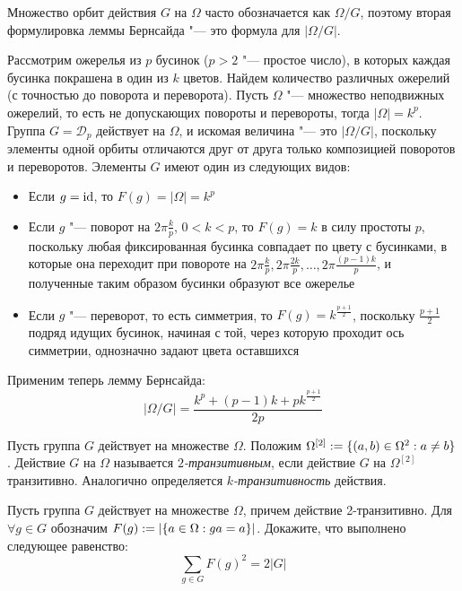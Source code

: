 \begin{note}
	Множество орбит действия $G$ на $\Omega$ часто обозначается как $\Omega / G$, поэтому вторая формулировка леммы Бернсайда "--- это формула для $|\Omega / G|$.
\end{note}

\begin{example}
	Рассмотрим ожерелья из $p$ бусинок ($p > 2$ "--- простое число), в которых каждая бусинка покрашена в один из $k$ цветов. Найдем количество различных ожерелий (с точностью до поворота и переворота). Пусть $\Omega$ "--- множество неподвижных ожерелий, то есть не допускающих повороты и перевороты, тогда $|\Omega| = k^p$. Группа $G = \mathcal{D}_p$ действует на $\Omega$, и искомая величина "--- это $|\Omega / G|$, поскольку элементы одной орбиты отличаются друг от друга только композицией поворотов и переворотов. Элементы $G$ имеют один из следующих видов:
	\begin{itemize}
		\item Если $g = \operatorname{id}$, то $F(g) = |\Omega| = k^p$
		\item Если $g$ "--- поворот на $2\pi\frac kp$, $0 < k < p$, то $F(g) = k$ в силу простоты $p$, поскольку любая фиксированная бусинка совпадает по цвету с бусинками, в которые она переходит при повороте на $2\pi\frac kp, 2\pi\frac {2k}p, \dotsc, 2\pi\frac {(p-1)k}p$, и полученные таким образом бусинки образуют все ожерелье
		\item Если $g$ "--- переворот, то есть симметрия, то $F(g) = k^{\frac{p+1}2}$, поскольку ${\frac{p+1}2}$ подряд идущих бусинок, начиная с той, через которую проходит ось симметрии, однозначно задают цвета оставшихся
	\end{itemize}
	
	Применим теперь лемму Бернсайда:
	\[|\Omega / G| = \frac{k^p + (p-1)k + pk^{\frac{p+1}2}}{2p}\]
\end{example}

\begin{definition}
	Пусть группа $G$ действует на множестве $\Omega$. Положим $\Omega^{[2]} := \{(a, b) \hm\in \Omega^2: a \ne b\}$. Действие $G$ на $\Omega$ называется \textit{$2$-транзитивным}, если действие $G$ на $\Omega^{[2]}$ транзитивно. Аналогично определяется \textit{$k$-транзитивность} действия.
\end{definition}

\begin{exercise}
	Пусть группа $G$ действует на множестве $\Omega$, причем действие 2\nobreakdash-транзитивно. Для $\forall g \in G$ обозначим $F(g) := |\{a \hm\in \Omega: ga = a\}|$. Докажите, что выполнено следующее равенство:
	\[\sum\limits_{g \in G}F(g)^2 = 2|G|\]
\end{exercise}

